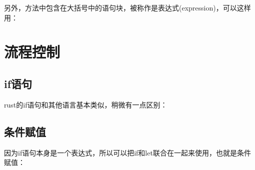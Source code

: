 \documentclass[12pt]{article}
\begin{document}
另外，方法中包含在大括号中的语句块，被称作是表达式(expression)，可以这样用：

\begin{Shaded}
\begin{Highlighting}[]
\OperatorTok{=} \OperatorTok{\{}
\OperatorTok{+} 
\OperatorTok{\};}
\NormalTok{(}\OperatorTok{,}\OperatorTok{;}
\end{Highlighting}
\end{Shaded}

\section{流程控制}\label{ux6d41ux7a0bux63a7ux5236}

\subsection{if语句}\label{ifux8bedux53e5}

rust的if语句和其他语言基本类似，稍微有一点区别：

\begin{Shaded}
\begin{Highlighting}[]
\OperatorTok{\%}  \OperatorTok{==}  \OperatorTok{\{}        
    \NormalTok{(}\OperatorTok{,}\OperatorTok{;}
\OperatorTok{\}}  \OperatorTok{\%}  \OperatorTok{==}  \OperatorTok{\{} 
    \NormalTok{(}\OperatorTok{,}\OperatorTok{;}
\OperatorTok{\}}  \OperatorTok{\{}
    \NormalTok{(}\NormalTok{)}\OperatorTok{;}
\OperatorTok{\}}
\end{Highlighting}
\end{Shaded}

\subsection{条件赋值}\label{ux6761ux4ef6ux8d4bux503c}

因为if语句本身是一个表达式，所以可以把if和let联合在一起来使用，也就是条件赋值：
\end{document}

